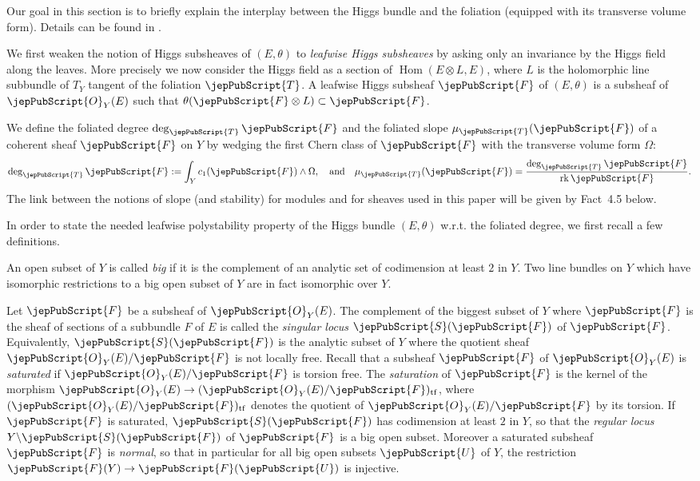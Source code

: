 Our goal in this section is to briefly explain the interplay between the Higgs bundle and the foliation (equipped with its transverse volume form). Details can be found in \cite[\S2.2]{jep93KM17}.

We first weaken the notion of Higgs subsheaves of $(E,\theta)$ to \emph{leafwise Higgs subsheaves} by asking only an invariance by the Higgs field along the leaves. More precisely we now consider the Higgs field as a section of $\operatorname{Hom}(E\otimes L,E)$, where $L$ is the holomorphic line subbundle of $T_Y$ tangent of the foliation $\jepPubScript{T}$. A leafwise Higgs subsheaf $\jepPubScript{F}$ of $(E,\theta)$ is a subsheaf of $\jepPubScript{O}_Y(E)$ such that $\theta(\jepPubScript{F}\otimes L)\subset\jepPubScript{F}$.

We define the foliated degree $\deg_{\jepPubScript{T}}\jepPubScript{F}$ and the foliated slope $\mu_{\jepPubScript{T}}(\jepPubScript{F})$ of a coherent sheaf $\jepPubScript{F}$ on $Y$ by wedging the first Chern class of $\jepPubScript{F}$ with the transverse volume form $\Omega$:
\[
\deg_{\jepPubScript{T}}\jepPubScript{F}:=\int_Y c_1(\jepPubScript{F})\wedge\Omega,\quad\text{and}\quad\mu_{\jepPubScript{T}}(\jepPubScript{F})=\frac{\deg_{\jepPubScript{T}}\jepPubScript{F}}{\operatorname{rk}\jepPubScript{F}}.
\]
The link between the notions of slope (and stability) for modules and for sheaves used in this paper will be given by Fact~4.5 below.

In order to state the needed leafwise polystability property of the Higgs bundle $(E,\theta)$ w.r.t. the foliated degree, we first recall a few definitions.

An open subset of $Y$ is called \emph{big} if it is the complement of an analytic set of codimension at least $2$ in $Y$. Two line bundles on $Y$ which have isomorphic restrictions to a big open subset of $Y$ are in fact isomorphic over $Y$.

Let $\jepPubScript{F}$ be a subsheaf of $\jepPubScript{O}_Y(E)$. The complement of the biggest subset of $Y$ where $\jepPubScript{F}$ is the sheaf of sections of a subbundle $F$ of $E$ is called the \emph{singular locus} $\jepPubScript{S}(\jepPubScript{F})$ of $\jepPubScript{F}$. Equivalently, $\jepPubScript{S}(\jepPubScript{F})$ is the analytic subset of $Y$ where the quotient sheaf $\jepPubScript{O}_Y(E)/\jepPubScript{F}$ is not locally free. Recall that a subsheaf $\jepPubScript{F}$ of $\jepPubScript{O}_Y(E)$ is \emph{saturated} if $\jepPubScript{O}_Y(E)/\jepPubScript{F}$ is torsion free. The \emph{saturation} of $\jepPubScript{F}$ is the kernel of the morphism $\jepPubScript{O}_Y(E)\to(\jepPubScript{O}_Y(E)/\jepPubScript{F})_{\mathrm{tf}}$, where $(\jepPubScript{O}_Y(E)/\jepPubScript{F})_{\mathrm{tf}}$ denotes the quotient of $\jepPubScript{O}_Y(E)/\jepPubScript{F}$ by its torsion. If $\jepPubScript{F}$ is saturated, $\jepPubScript{S}(\jepPubScript{F})$ has codimension at least $2$ in $Y$, so that the \emph{regular locus} $Y\backslash\jepPubScript{S}(\jepPubScript{F})$ of $\jepPubScript{F}$ is a big open subset. Moreover a saturated subsheaf $\jepPubScript{F}$ is \emph{normal}, so that in particular for all big open subsets $\jepPubScript{U}$ of $Y$, the restriction $\jepPubScript{F}(Y)\to\jepPubScript{F}(\jepPubScript{U})$ is injective.

